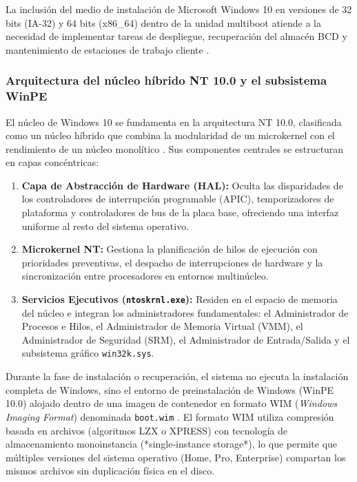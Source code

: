 \documentclass[12pt]{article}
\begin{document}
La inclusión del medio de instalación de Microsoft Windows 10 en versiones de 32 bits (IA-32) y 64 bits (x86\_64) dentro de la unidad multiboot atiende a la necesidad de implementar tareas de despliegue, recuperación del almacén BCD y mantenimiento de estaciones de trabajo cliente \parencite{microsoft2024win10}.

\subsubsection{Arquitectura del núcleo híbrido NT 10.0 y el subsistema WinPE}

El núcleo de Windows 10 se fundamenta en la arquitectura NT 10.0, clasificada como un núcleo híbrido que combina la modularidad de un microkernel con el rendimiento de un núcleo monolítico \parencite[\S 2.4, p.\ 75]{stallings2018operating}. Sus componentes centrales se estructuran en capas concéntricas:
\begin{enumerate}[noitemsep, topsep=2pt]
    \item \textbf{Capa de Abstracción de Hardware (HAL):} Oculta las disparidades de los controladores de interrupción programable (APIC), temporizadores de plataforma y controladores de bus de la placa base, ofreciendo una interfaz uniforme al resto del sistema operativo.
    \item \textbf{Microkernel NT:} Gestiona la planificación de hilos de ejecución con prioridades preventivas, el despacho de interrupciones de hardware y la sincronización entre procesadores en entornos multinúcleo.
    \item \textbf{Servicios Ejecutivos (\texttt{ntoskrnl.exe}):} Residen en el espacio de memoria del núcleo e integran los administradores fundamentales: el Administrador de Procesos e Hilos, el Administrador de Memoria Virtual (VMM), el Administrador de Seguridad (SRM), el Administrador de Entrada/Salida y el subsistema gráfico \texttt{win32k.sys}.
\end{enumerate}

Durante la fase de instalación o recuperación, el sistema no ejecuta la instalación completa de Windows, sino el entorno de preinstalación de Windows (WinPE 10.0) alojado dentro de una imagen de contenedor en formato WIM (\textit{Windows Imaging Format}) denominada \texttt{boot.wim} \parencite{microsoft2024winpe}. El formato WIM utiliza compresión basada en archivos (algoritmos LZX o XPRESS) con tecnología de almacenamiento monoinstancia (*single-instance storage*), lo que permite que múltiples versiones del sistema operativo (Home, Pro, Enterprise) compartan los mismos archivos sin duplicación física en el disco.
\end{document}
